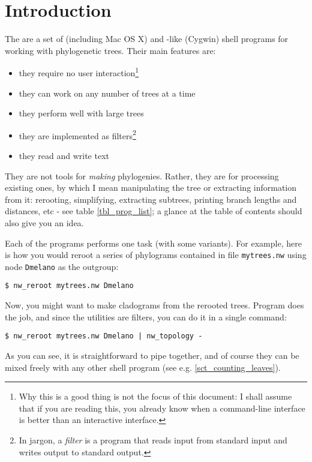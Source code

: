 \clearpage
{}
\chapter*{Introduction}

The \nutils{} are a set of \unix{} (including Mac OS X) and \unix-like (Cygwin) shell programs for working with phylogenetic trees. Their main features are:
\begin{itemize}
 \item they require no user interaction\footnote{Why this is a good thing is not the focus of this document: I shall assume that if you are reading this, you already know when a command-line interface is better than an interactive interface.}
 \item they can work on any number of trees at a time
 \item they perform well with large trees
 \item they are implemented as filters\footnote{In \unix{} jargon, a
 \textit{filter} is a program that reads input from standard input and writes
 output to standard output.}
 \item they read and write text
\end{itemize}
They are not tools for \emph{making} phylogenies. Rather, they are for
processing existing ones, by which I mean manipulating the tree or extracting
information from it: rerooting, simplifying, extracting subtrees, printing
branch lengths and distances, etc - see table \ref{tbl_prog_list}; a glance
at the table of contents should also give you an idea.

Each of the programs performs one task (with some variants). For example, here
is how you would reroot a series of phylograms contained in file
\texttt{mytrees.nw} using node \texttt{Dmelano} as the outgroup:

\begin{verbatim}
$ nw_reroot mytrees.nw Dmelano
\end{verbatim} 
Now, you might want to make cladograms from the rerooted trees. Program \topology{} does the job, and since the utilities are filters, you can do it in a single command:
\begin{verbatim}
$ nw_reroot mytrees.nw Dmelano | nw_topology -
\end{verbatim}
As you can see, it is straightforward to pipe \nutils{} together, and of course they can be mixed freely with any other shell program (see e.g. \ref{sct_counting_leaves}).

